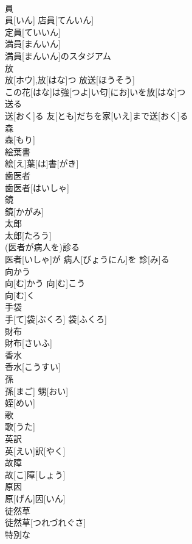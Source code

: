 \documentclass[8pt]{extreport}
\begin{document}
\begin{CJK}{UTF8}{min}
\\	員	
\\	員[いん]	店員[てんいん] 
\\	定員[ていいん] 
\\	満員[まんいん] 
\\	満員[まんいん]のスタジアム 
\\	放	
\\	放[ホウ],放[はな]つ	放送[ほうそう] 
\\	この花[はな]は強[つよ]い匂[にお]いを放[はな]つ 
\\	送る	
\\	送[おく]る	友[とも]だちを家[いえ]まで送[おく]る 
\\	森	
\\	森[もり]	
\\	絵葉書	
\\	絵[え]葉[は]書[がき]	
\\	歯医者	
\\	歯医者[はいしゃ]	
\\	鏡	
\\	鏡[かがみ]	
\\	太郎	
\\	太郎[たろう]	
\\	(医者が病人を)診る	
\\	医者[いしゃ]が 病人[びょうにん]を 診[み]る	
\\	向かう	
\\	向[む]かう	向[む]こう 
\\	向[む]く 
\\	手袋	
\\	手[て]袋[ぶくろ]	袋[ふくろ] 
\\	財布	
\\	財布[さいふ]	
\\	香水	
\\	香水[こうすい]	
\\	孫	
\\	孫[まご]	甥[おい] 
\\	姪[めい] 
\\	歌	
\\	歌[うた]	
\\	英訳	
\\	英[えい]訳[やく]	
\\	故障	
\\	故[こ]障[しょう]	
\\	原因	
\\	原[げん]因[いん]	
\\	徒然草	
\\	徒然草[つれづれぐさ]	
\\	特別な	

\end{CJK}
\end{document}
